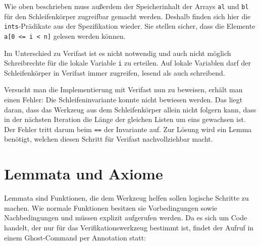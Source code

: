 Wie oben beschrieben muss außerdem der Speicherinhalt der Arrays \lstinline{al} und \lstinline{bl} für
den Schleifenkörper zugreifbar gemacht werden. Deshalb finden sich hier die \lstinline{ints}-Prädikate
aus der Spezifikation wieder. Sie stellen sicher, dass die Elemente \lstinline{a[0 <= i < n]} gelesen
werden können.

Im Unterschied zu Verifast ist es nicht notwendig und auch nicht möglich Schreibrechte für die lokale Variable 
\lstinline{i} zu erteilen. Auf lokale Variablen darf der Schleifenkörper in Verifast immer zugreifen, lesend
als auch schreibend.

Versucht man die Implementierung mit Verifast nun zu beweisen, erhält man einen Fehler: Die Schleifeninvariante
konnte nicht bewiesen werden. 
Das liegt daran, dass das Werkzeug aus dem Schleifenkörper allein nicht folgern kann, dass in der nächsten Iteration 
die Länge der gleichen Listen um eins gewachsen ist. Der Fehler tritt darum beim \lstinline{==} der Invariante auf.
Zur Lösung wird ein Lemma benötigt, welchen diesen Schritt für Verifast nachvollziehbar macht.



\section{Lemmata und Axiome}
\label{verifizierung:lemma}

Lemmata sind Funktionen, die dem Werkzeug helfen sollen logische Schritte zu machen. Wie normale
Funktionen besitzen sie Vorbedingungen sowie Nachbedingungen und müssen explizit aufgerufen werden.
Da es sich um Code handelt, der nur für das Verifikationswerkzeug bestimmt ist, findet der Aufruf
in einem Ghost-Command per Annotation statt:

